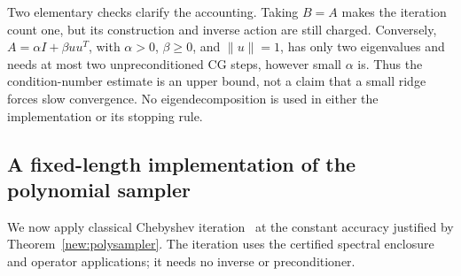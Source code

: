 \documentclass[11pt]{amsart}
\theoremstyle{definition}\newtheorem{definition}[theorem]{Definition}
\theoremstyle{remark}\newtheorem{remark}[theorem]{Remark}
\numberwithin{equation}{section}
\begin{document}
Two elementary checks clarify the accounting. Taking $B=A$ makes the
iteration count one, but its construction and inverse action are still
charged. Conversely, $A=\alpha I+\beta uu^T$, with $\alpha>0$,
$\beta\ge0$, and $\|u\|=1$, has only two eigenvalues and needs at most
two unpreconditioned CG steps, however small $\alpha$ is. Thus the
condition-number estimate is an upper bound, not a claim that a small
ridge forces slow convergence. No eigendecomposition is used in either
the implementation or its stopping rule.

\subsection{A fixed-length implementation of the polynomial sampler}
\label{new:polyimplementation}
We now apply classical Chebyshev iteration~\cite[Section~12.3.2]{Saad}
at the constant accuracy justified by Theorem~\ref{new:polysampler}.
The iteration uses the certified spectral enclosure and operator
applications; it needs no inverse or preconditioner.
\end{document}
